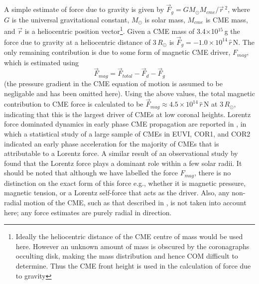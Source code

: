 A simple estimate of force due to gravity is given by $\vec{F}_{g}=GM_{\odot}M_{cme}/\vec{r}\,^2$, where $G$ is the universal gravitational constant, $M_{\odot}$ is solar mass, $M_{cme}$ is CME mass, and $\vec{r}$ is a heliocentric position vector\footnote{Ideally the heliocentric distance of the CME centre of mass would be used here. However an unknown amount of mass is obscured by the coronagraphs occulting disk, making the mass distribution and hence COM difficult to determine. Thus the CME front height is used in the calculation of force due to gravity}. Given a CME mass of 3.4$\times$10$^{15}$\,g the force due to gravity at a heliocentric distance of 3\,$R_{\odot}$ is $\vec{F}_{g}=-1.0\times10^
{14}\,\hat{r}$\,N. The only remaining contribution is due to some form of magnetic CME driver, $F_{mag}$, which is estimated using 
\begin{equation}
\vec{F}_{mag}= \vec{F}_{total}-\vec{F}_{d}-\vec{F}_{g}
\end{equation}
(the pressure gradient in the CME equation of motion is assumed to be negligable and has been omitted here). Using the above values, the total magnetic contribution to CME force is calculated to be $\vec{F}_{mag}\approx4.5\times10^{14}\,\hat{r}$\,N at 3\,$R_{\odot}$, indicating that this is the largest driver of CMEs at low coronal heights. Lorentz force dominated dynamics in early phase CME propagation are reported in \citet{bein2011}, in which a statistical study of a large sample of CMEs in EUVI, COR1, and COR2 indicated an early phase acceleration for the majority of CMEs that is attributable to a Lorentz force.  A similar result of an observational study by \citet{vrs06} found that the Lorentz force plays a dominant role within a few solar radii. It should be noted that although we have labelled the force $F_{mag}$, there is no distinction on the exact form of this force e.g., whether it is magnetic pressure, magnetic tension, or a Lorentz self-force that acts as the driver. Also, any non-radial motion of the CME, such as that described in \citet{byr10}, is not taken into account here; any force estimates are purely radial in direction.


